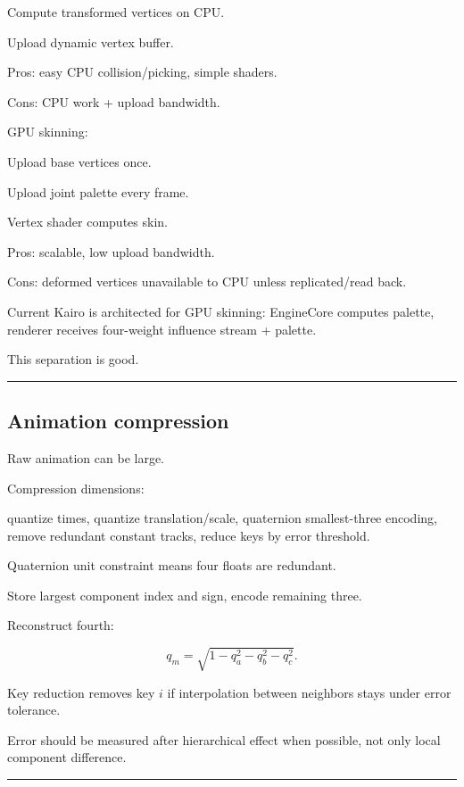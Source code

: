 Compute transformed vertices on CPU.

Upload dynamic vertex buffer.

Pros: easy CPU collision/picking, simple shaders.

Cons: CPU work + upload bandwidth.

GPU skinning:

Upload base vertices once.

Upload joint palette every frame.

Vertex shader computes skin.

Pros: scalable, low upload bandwidth.

Cons: deformed vertices unavailable to CPU unless replicated/read back.

Current Kairo is architected for GPU skinning: EngineCore computes palette, renderer receives four-weight influence stream + palette.

This separation is good.

\begin{center}\rule{0.5\linewidth}{0.5pt}\end{center}

\subsection{Animation compression}\label{04-visual-computing-ii-ch041-animation-compression}

\hypertarget{04-visual-computing-ii-ch041-animation-compression}{}

Raw animation can be large.

Compression dimensions:

quantize times, quantize translation/scale, quaternion smallest-three encoding, remove redundant constant tracks, reduce keys by error threshold.

Quaternion unit constraint means four floats are redundant.

Store largest component index and sign, encode remaining three.

Reconstruct fourth:

\[
q_m=
\sqrt{
1-
q_a^2-
q_b^2-
q_c^2
}.
\]

Key reduction removes key \(i\) if interpolation between neighbors stays under error tolerance.

Error should be measured after hierarchical effect when possible, not only local component difference.

\begin{center}\rule{0.5\linewidth}{0.5pt}\end{center}

